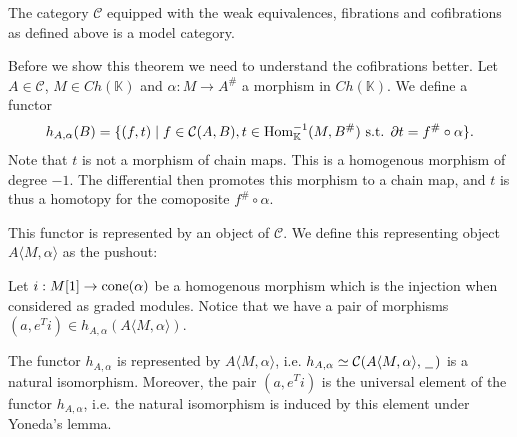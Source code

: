 \documentclass[../thesis.tex]{subfiles}
\begin{document}
            \begin{thm}\label{thm: model-str-alg}
                The category $\mathcal{C}$ equipped with the weak equivalences, fibrations and cofibrations as defined above is a model category.
            \end{thm}

            Before we show this theorem we need to understand the cofibrations better. Let $A\in\mathcal{C}$, $M\in Ch(\mathbb{K})$ and $\alpha : M \rightarrow A^\#$ a morphism in $Ch(\mathbb{K})$. We define a functor 
            \begin{align*}
                h_{A,\alpha}(B) = \startset{(f,t)\mid f\in \mathcal{C}(A,B), t\in \tt{Hom}^{-1}_\mathbb{K}(M, B^\#) \tt{ s.t. } \partial t = f^\#\circ\alpha}.
            \end{align*}
            Note that $t$ is not a morphism of chain maps. This is a homogenous morphism of degree $-1$. The differential then promotes this morphism to a chain map, and $t$ is thus a homotopy for the comoposite $f^\#\circ\alpha$.

            This functor is represented by an object of $\mathcal{C}$. We define this representing object $A\langle M, \alpha\rangle$ as the pushout:
            \begin{center}
            \end{center}
            Let $i: M[1] \rightarrow \tt{cone}(\alpha)$ be a homogenous morphism which is the injection when considered as graded modules. Notice that we have a pair of morphisms $(a, e^Ti)\in h_{A,\alpha}(A\langle M,\alpha\rangle)$.
                
            \begin{proposition}\label{prop: universal-h}
                The functor $h_{A,\alpha}$ is represented by $A\langle M,\alpha\rangle$, i.e. $h_{A,\alpha}\simeq \mathcal{C}(A\langle M,\alpha\rangle,\argument)$ is a natural isomorphism. Moreover, the pair $(a,e^Ti)$ is the universal element of the functor $h_{A,\alpha}$, i.e. the natural isomorphism is induced by this element under Yoneda's lemma.
            \end{proposition}
\end{document}
